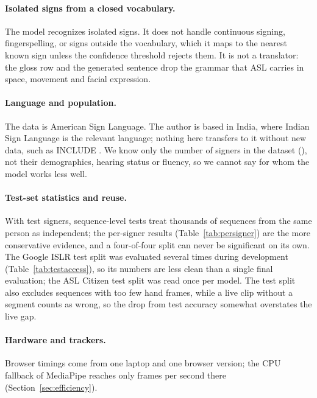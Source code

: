 \paragraph{Isolated signs from a closed vocabulary.} The model recognizes  isolated
signs. It does not handle continuous signing, fingerspelling, or signs outside the vocabulary,
which it maps to the nearest known sign unless the confidence threshold rejects them. It is not a
translator: the gloss row and the generated sentence drop the grammar that ASL carries in space,
movement and facial expression.

\paragraph{Language and population.} The data is American Sign Language. The author is based in
India, where Indian Sign Language is the relevant language; nothing here transfers to it without
new data, such as INCLUDE \citep{sridhar2020include}. We know only the number of signers in the
dataset (), not their demographics, hearing status or fluency, so we cannot say
for whom the model works less well.

\paragraph{Test-set statistics and reuse.} With  test signers, sequence-level
tests treat thousands of sequences from the same person as independent; the per-signer results
(Table~\ref{tab:persigner}) are the more conservative evidence, and a four-of-four split can never
be significant on its own. The Google ISLR test split was evaluated several times during
development (Table~\ref{tab:testaccess}), so its numbers are less clean than a single final
evaluation; the ASL Citizen test split was read once per model. The test split also excludes
sequences with too few hand frames, while a live clip without a segment counts as wrong, so the
drop from test accuracy somewhat overstates the live gap.

\paragraph{Hardware and trackers.} Browser timings come from one laptop and one browser version;
the CPU fallback of MediaPipe reaches only  frames per second there
(Section~\ref{sec:efficiency}).
